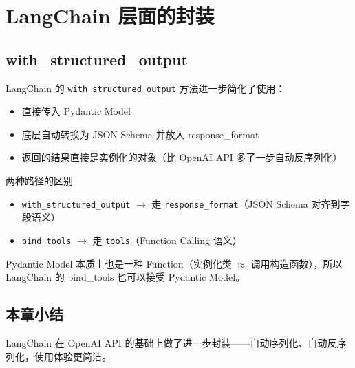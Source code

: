 \section{LangChain 层面的封装}

\subsection{with\_structured\_output}

LangChain 的 \texttt{with\_structured\_output} 方法进一步简化了使用：

\begin{itemize}
    \item 直接传入 Pydantic Model
    \item 底层自动转换为 JSON Schema 并放入 response\_format
    \item 返回的结果直接是实例化的对象（比 OpenAI API 多了一步自动反序列化）
\end{itemize}

\begin{warningbox}{两种路径的区别}
\begin{itemize}
    \item \texttt{with\_structured\_output} $\rightarrow$ 走 \texttt{response\_format}（JSON Schema 对齐到字段语义）
    \item \texttt{bind\_tools} $\rightarrow$ 走 \texttt{tools}（Function Calling 语义）
\end{itemize}
Pydantic Model 本质上也是一种 Function（实例化类 $\approx$ 调用构造函数），所以 LangChain 的 bind\_tools 也可以接受 Pydantic Model。
\end{warningbox}

\subsection{本章小结}

LangChain 在 OpenAI API 的基础上做了进一步封装——自动序列化、自动反序列化，使用体验更简洁。

